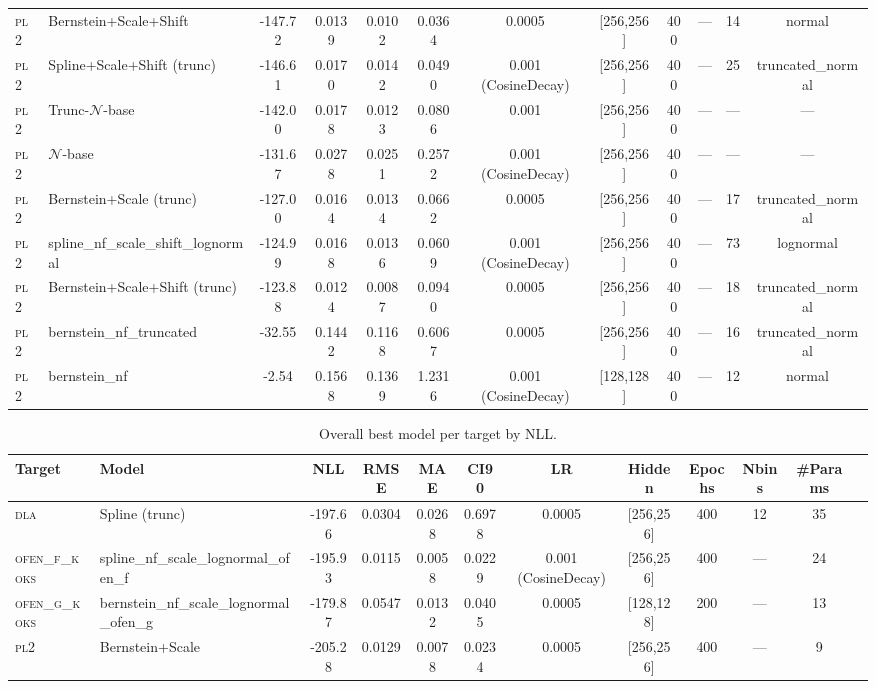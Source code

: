\begin{table}[htbp]
\begin{tabular}{llS[table-format=-4.2]S[table-format=-4.2]S[table-format=-1.4]S[table-format=-1.4]cccccc}
\textsc{pl2} & Bernstein+Scale+Shift & -147.72 & 0.0139 & 0.0102 & 0.0364 & 0.0005 & [256,256] & 400 & — & 14 & normal \\
\textsc{pl2} & Spline+Scale+Shift (trunc) & -146.61 & 0.0170 & 0.0142 & 0.0490 & 0.001 (CosineDecay) & [256,256] & 400 & — & 25 & truncated_normal \\
\textsc{pl2} & Trunc-$\mathcal{N}$-base & -142.00 & 0.0178 & 0.0123 & 0.0806 & 0.001 & [256,256] & 400 & — & — & — \\
\textsc{pl2} & $\mathcal{N}$-base & -131.67 & 0.0278 & 0.0251 & 0.2572 & 0.001 (CosineDecay) & [256,256] & 400 & — & — & — \\
\textsc{pl2} & Bernstein+Scale (trunc) & -127.00 & 0.0164 & 0.0134 & 0.0662 & 0.0005 & [256,256] & 400 & — & 17 & truncated_normal \\
\textsc{pl2} & spline_nf_scale_shift_lognormal & -124.99 & 0.0168 & 0.0136 & 0.0609 & 0.001 (CosineDecay) & [256,256] & 400 & — & 73 & lognormal \\
\textsc{pl2} & Bernstein+Scale+Shift (trunc) & -123.88 & 0.0124 & 0.0087 & 0.0940 & 0.0005 & [256,256] & 400 & — & 18 & truncated_normal \\
\textsc{pl2} & bernstein_nf_truncated & -32.55 & 0.1442 & 0.1168 & 0.6067 & 0.0005 & [256,256] & 400 & — & 16 & truncated_normal \\
\textsc{pl2} & bernstein_nf & -2.54 & 0.1568 & 0.1369 & 1.2316 & 0.001 (CosineDecay) & [128,128] & 400 & — & 12 & normal \\
\bottomrule
\end{tabular}
\end{table}


\begin{table}[htbp]
\caption{Overall best model per target by NLL.}
\label{tab:hpo_winners}
\begin{tabular}{llS[table-format=-4.2]S[table-format=-4.2]S[table-format=-1.4]S[table-format=-1.4]cccccc}
\toprule
Target & Model & NLL & RMSE & MAE & CI90 & LR & Hidden & Epochs & Nbins & \#Params \\
\midrule
\textsc{dla} & Spline (trunc) & -197.66 & 0.0304 & 0.0268 & 0.6978 & 0.0005 & [256,256] & 400 & 12 & 35 \\
\textsc{ofen\_f\_koks} & spline_nf_scale_lognormal_ofen_f & -195.93 & 0.0115 & 0.0058 & 0.0229 & 0.001 (CosineDecay) & [256,256] & 400 & — & 24 \\
\textsc{ofen\_g\_koks} & bernstein_nf_scale_lognormal_ofen_g & -179.87 & 0.0547 & 0.0132 & 0.0405 & 0.0005 & [128,128] & 200 & — & 13 \\
\textsc{pl2} & Bernstein+Scale & -205.28 & 0.0129 & 0.0078 & 0.0234 & 0.0005 & [256,256] & 400 & — & 9 \\
\bottomrule
\end{tabular}
\end{table}


